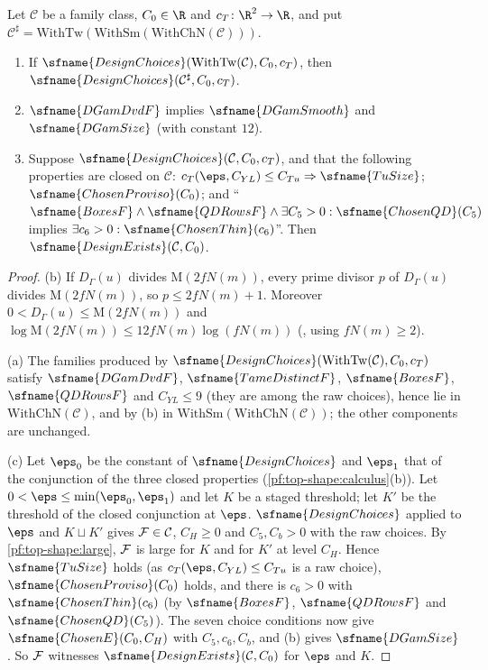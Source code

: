 \begin{lemma}\label{pf:top-shape:upN}
Let $\mathcal C$ be a family class, $C_0\in\R$ and $c_T\colon\R^2\to\R$, and put
$\mathcal C^\sharp=\mathrm{WithTw}(\mathrm{WithSm}(\mathrm{WithChN}(\mathcal C)))$.
\begin{enumerate}[label=(\alph*)]
\item If $\sfname{DesignChoices}(\mathrm{WithTw}(\mathcal C),C_0,c_T)$, then
$\sfname{DesignChoices}(\mathcal C^\sharp,C_0,c_T)$.
\item $\sfname{DGamDvdF}$ implies $\sfname{DGamSmooth}$ and $\sfname{DGamSize}$ (with constant $12$).
\item Suppose $\sfname{DesignChoices}(\mathcal C,C_0,c_T)$, and that the following properties are closed on
$\mathcal C$: $c_T(\eps,C_{YL})\le C_{Tu}\Rightarrow\sfname{TuSize}$; $\sfname{ChosenProviso}(C_0)$; and
``$\sfname{BoxesF}\wedge\sfname{QDRowsF}\wedge\exists C_5>0:\sfname{ChosenQD}(C_5)$ implies
$\exists c_6>0:\sfname{ChosenThin}(c_6)$''. Then $\sfname{DesignExists}(\mathcal C,C_0)$.
\end{enumerate}
\end{lemma}

\begin{proof}
(b) If $D_\Gamma(u)$ divides $\mathrm M(2fN(m))$, every prime divisor $p$ of $D_\Gamma(u)$ divides $\mathrm M(2fN(m))$, so
$p\le2fN(m)+1$. Moreover $0<D_\Gamma(u)\le\mathrm M(2fN(m))$ and $\log\mathrm M(2fN(m))\le12fN(m)\log(fN(m))$
(, using $fN(m)\ge2$).

(a) The families produced by $\sfname{DesignChoices}(\mathrm{WithTw}(\mathcal C),C_0,c_T)$ satisfy $\sfname{DGamDvdF}$,
$\sfname{TameDistinctF}$, $\sfname{BoxesF}$, $\sfname{QDRowsF}$ and $C_{YL}\le9$ (they are among the raw choices), hence
lie in $\mathrm{WithChN}(\mathcal C)$, and by (b) in $\mathrm{WithSm}(\mathrm{WithChN}(\mathcal C))$; the other components
are unchanged.

(c) Let $\eps_0$ be the constant of $\sfname{DesignChoices}$ and $\eps_1$ that of the conjunction of the three closed
properties (\cref{pf:top-shape:calculus}(b)). Let $0<\eps\le\min(\eps_0,\eps_1)$ and let $K$ be a staged threshold;
let $K'$ be the threshold of the closed conjunction at $\eps$. $\sfname{DesignChoices}$ applied to $\eps$ and $K\sqcup
K'$ gives $\mathcal{F}\in\mathcal C$, $C_H\ge0$ and $C_5,C_b>0$ with the raw choices. By \cref{pf:top-shape:large},
$\mathcal{F}$ is large for $K$ and for $K'$ at level $C_H$. Hence $\sfname{TuSize}$ holds (as $c_T(\eps,C_{YL})\le C_{Tu}$
is a raw choice), $\sfname{ChosenProviso}(C_0)$ holds, and there is $c_6>0$ with $\sfname{ChosenThin}(c_6)$ (by
$\sfname{BoxesF}$, $\sfname{QDRowsF}$ and $\sfname{ChosenQD}(C_5)$). The seven choice conditions now give
$\sfname{ChosenE}(C_0,C_H)$ with $C_5,c_6,C_b$, and (b) gives $\sfname{DGamSize}$. So $\mathcal{F}$ witnesses
$\sfname{DesignExists}(\mathcal C,C_0)$ for $\eps$ and $K$.
\end{proof}

